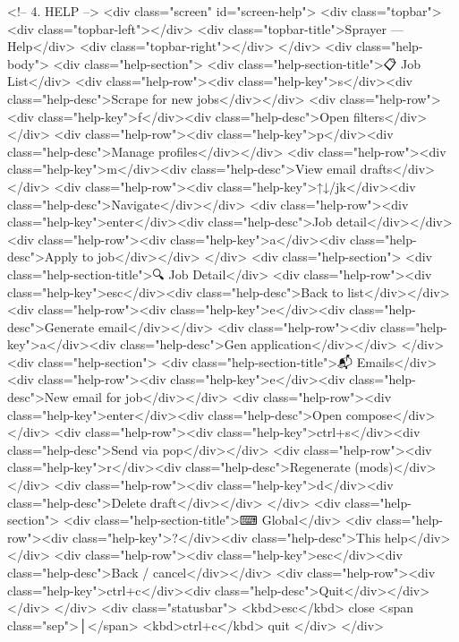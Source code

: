{{{{{{{{{{{{{{<!-- 4. HELP -->
<div class="screen" id="screen-help">
  <div class="topbar">
    <div class="topbar-left"></div>
    <div class="topbar-title">Sprayer — Help</div>
    <div class="topbar-right"></div>
  </div>
  <div class="help-body">
    <div class="help-section">
      <div class="help-section-title">📋 Job List</div>
      <div class="help-row"><div class="help-key">s</div><div class="help-desc">Scrape for new jobs</div></div>
      <div class="help-row"><div class="help-key">f</div><div class="help-desc">Open filters</div></div>
      <div class="help-row"><div class="help-key">p</div><div class="help-desc">Manage profiles</div></div>
      <div class="help-row"><div class="help-key">m</div><div class="help-desc">View email drafts</div></div>
      <div class="help-row"><div class="help-key">↑↓/jk</div><div class="help-desc">Navigate</div></div>
      <div class="help-row"><div class="help-key">enter</div><div class="help-desc">Job detail</div></div>
      <div class="help-row"><div class="help-key">a</div><div class="help-desc">Apply to job</div></div>
    </div>
    <div class="help-section">
      <div class="help-section-title">🔍 Job Detail</div>
      <div class="help-row"><div class="help-key">esc</div><div class="help-desc">Back to list</div></div>
      <div class="help-row"><div class="help-key">e</div><div class="help-desc">Generate email</div></div>
      <div class="help-row"><div class="help-key">a</div><div class="help-desc">Gen application</div></div>
    </div>
    <div class="help-section">
      <div class="help-section-title">📬 Emails</div>
      <div class="help-row"><div class="help-key">e</div><div class="help-desc">New email for job</div></div>
      <div class="help-row"><div class="help-key">enter</div><div class="help-desc">Open compose</div></div>
      <div class="help-row"><div class="help-key">ctrl+s</div><div class="help-desc">Send via pop</div></div>
      <div class="help-row"><div class="help-key">r</div><div class="help-desc">Regenerate (mods)</div></div>
      <div class="help-row"><div class="help-key">d</div><div class="help-desc">Delete draft</div></div>
    </div>
    <div class="help-section">
      <div class="help-section-title">⌨ Global</div>
      <div class="help-row"><div class="help-key">?</div><div class="help-desc">This help</div></div>
      <div class="help-row"><div class="help-key">esc</div><div class="help-desc">Back / cancel</div></div>
      <div class="help-row"><div class="help-key">ctrl+c</div><div class="help-desc">Quit</div></div>
    </div>
  </div>
  <div class="statusbar">
    <kbd>esc</kbd> close <span class="sep">│</span> <kbd>ctrl+c</kbd> quit
  </div>
</div>

}}}}}}}}}}}}}}
